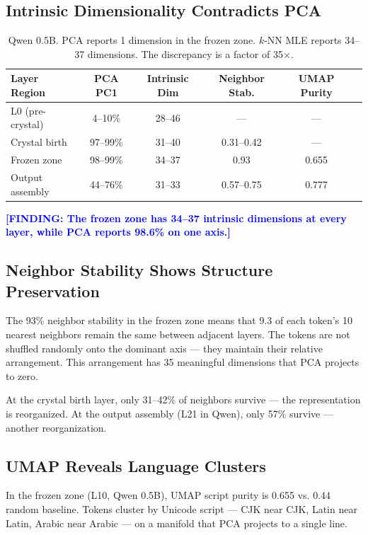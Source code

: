 \documentclass[11pt]{article}
\newcommand{\finding}[1]{\textcolor{blue}{\textbf{[FINDING: #1]}}}
\begin{document}
\subsection{Intrinsic Dimensionality Contradicts PCA}

\begin{table}[h]
\centering
\begin{tabular}{lccccc}
\toprule
Layer Region & PCA PC1 & Intrinsic Dim & Neighbor Stab. & UMAP Purity \\
\midrule
L0 (pre-crystal) & 4--10\% & 28--46 & --- & --- \\
Crystal birth & 97--99\% & 31--40 & 0.31--0.42 & --- \\
Frozen zone & 98--99\% & 34--37 & 0.93 & 0.655 \\
Output assembly & 44--76\% & 31--33 & 0.57--0.75 & 0.777 \\
\bottomrule
\end{tabular}
\caption{Qwen 0.5B. PCA reports 1 dimension in the frozen zone. $k$-NN MLE reports 34--37 dimensions. The discrepancy is a factor of 35$\times$.}
\end{table}

\finding{The frozen zone has 34--37 intrinsic dimensions at every layer, while PCA reports 98.6\% on one axis.}

\subsection{Neighbor Stability Shows Structure Preservation}

The 93\% neighbor stability in the frozen zone means that 9.3 of each token's 10 nearest neighbors remain the same between adjacent layers. The tokens are not shuffled randomly onto the dominant axis --- they maintain their relative arrangement. This arrangement has 35 meaningful dimensions that PCA projects to zero.

At the crystal birth layer, only 31--42\% of neighbors survive --- the representation is reorganized. At the output assembly (L21 in Qwen), only 57\% survive --- another reorganization.

\subsection{UMAP Reveals Language Clusters}

In the frozen zone (L10, Qwen 0.5B), UMAP script purity is 0.655 vs. 0.44 random baseline. Tokens cluster by Unicode script --- CJK near CJK, Latin near Latin, Arabic near Arabic --- on a manifold that PCA projects to a single line.
\end{document}
